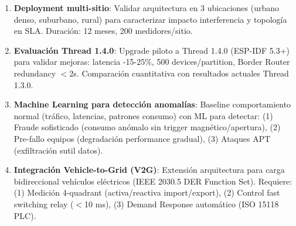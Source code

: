 \begin{enumerate}
    \item \textbf{Deployment multi-sitio}: Validar arquitectura en 3 ubicaciones (urbano denso, suburbano, rural) para caracterizar impacto interferencia y topología en SLA. Duración: 12 meses, 200 medidores/sitio.
    
    \item \textbf{Evaluación Thread 1.4.0}: Upgrade piloto a Thread 1.4.0 (ESP-IDF 5.3+) para validar mejoras: latencia -15-25\%, 500 devices/partition, Border Router redundancy $<$2s. Comparación cuantitativa con resultados actuales Thread 1.3.0.
    
    \item \textbf{Machine Learning para detección anomalías}: Baseline comportamiento normal (tráfico, latencias, patrones consumo) con ML para detectar: (1) Fraude sofisticado (consumo anómalo sin trigger magnético/apertura), (2) Pre-fallo equipos (degradación performance gradual), (3) Ataques APT (exfiltración sutil datos).
    
    \item \textbf{Integración Vehicle-to-Grid (V2G)}: Extensión arquitectura para carga bidireccional vehículos eléctricos (IEEE 2030.5 DER Function Set). Requiere: (1) Medición 4-quadrant (activa/reactiva import/export), (2) Control fast switching relay ($<$10 ms), (3) Demand Response automático (ISO 15118 PLC).
\end{enumerate}


